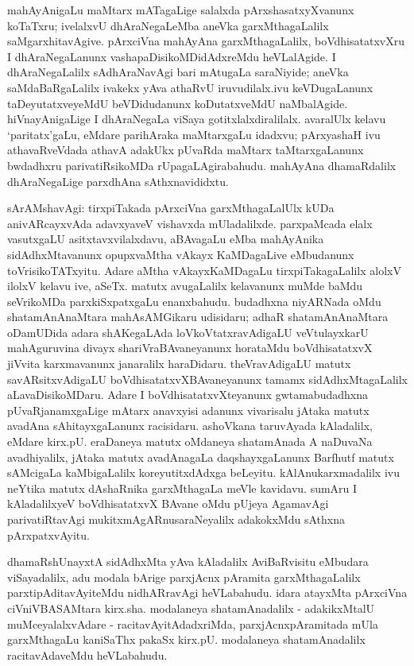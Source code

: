 mahAyAnigaLu maMtarx mATagaLige salalxda pArxshasatxyXvanunx koTaTxru; ivelalxvU dhAraNegaLeMba aneVka garxMthagaLalilx saMgarxhitavAgive. pArxciVna mahAyAna garxMthagaLalilx, boVdhisatatxvXru I dhAraNegaLanunx vashapaDisikoMDidAdxreMdu heVLalAgide. I dhAraNegaLalilx sAdhAraNavAgi bari mAtugaLa saraNiyide; aneVka saMdaBaRgaLalilx ivakekx yAva athaRvU iruvudilalx.ivu keVDugaLanunx taDeyutatxveyeMdU beVDidudanunx koDutatxveMdU naMbalAgide. hiVnayAnigaLige I dhAraNegaLa viSaya gotitxlalx\-diralilalx. avaralUlx kelavu `paritatx'gaLu, eMdare parihAraka maMtarxgaLu idadxvu; pArxyashaH ivu athavaRveVdada athavA adakUkx pUvaRda maMtarx taMtarxgaLanunx bwdadhxru parivatiRsikoMDa rUpagaLAgirabahudu. mahAyAna dhamaRdalilx dhAraNegaLige parxdhAna sAthxnavididxtu.

sArAMshavAgi: tirxpiTakada pArxciVna garxMthagaLalUlx kUDa anivARcayxvAda adavxyaveV vishavxda mUladalilxde. parxpaMcada elalx vasutxgaLU asitxtavxvilalxdavu, aBAva\-gaLu eMba mahAyAnika sidAdhxMtavanunx opupxvaMtha vAkayx KaMDagaLive eMbudanunx toVrisi\-koTATxyitu. Adare aMtha vAkayxKaMDagaLu tirxpiTakagaLalilx alolxV ilolxV kelavu ive, aSeTx. matutx avugaLalilx kelavanunx muMde baMdu seVrikoMDa parxkiSxpatxgaLu enanx\-bahudu. budadhxna niyARNada oMdu shatamAnAnaMtara mahAsAMGikaru udi\-sidaru; adhaR shatamAnAnaMtara oDamUDida adara shAKegaLAda loVkoVtatxravAdigaLU veVtulayxkarU mahAguruvina divayx shariVraBAvaneyanunx horataMdu boVdhisatatxvX jiVvita karxmavanunx janaralilx haraDidaru. theVravAdigaLU matutx savARsitxvAdigaLU boVdhisatatxvXBAvaneyanunx tamamx sidAdhxMtagaLalilx aLavaDisikoMDaru. Adare I boVdhi\-satatxvXteyanunx gwtamabudadhxna pUvaRjanamxgaLige mAtarx anavxyisi adanunx vivarisalu jAtaka matutx avadAna sAhitayxgaLanunx racisidaru. ashoVkana taruvAyada kAladalilx, eMdare kirx.pU. eraDaneya matutx oMdaneya shatamAnada A naDuvaNa avadhiyalilx, jAtaka matutx avadAnagaLa daqshayxgaLanunx Barfhutf matutx sAMcigaLa kaMbigaLalilx kore\-yutitxdAdxga beLeyitu. kAlAnukarxmadalilx ivu neYtika matutx dAshaRnika garxMthagaLa meVle kavidavu. sumAru I kAladalilxyeV boVdhisatatxvX BAvane oMdu pUjeya Agama\-vAgi parivatiRtavAgi mukitxmAgARnusaraNeyalilx adakokxMdu sAthxna pArxpatxvAyitu.

dhamaRshUnayxtA sidAdhxMta yAva kAladalilx AviBaRvisitu eMbudara viSayadalilx, adu modala bArige parxjAcnx pAramita garxMthagaLalilx parxtipAditavAyiteMdu nidhARra\-vAgi heVLabahudu. idara atayxMta pArxciVna ciVniVBASAMtara kirx.sha. modalaneya shatamAnadalilx - adakikxMtalU muMceyalalxvAdare - racitavAyitAdadxriMda, parxjAcnxpAramitada mUla garxMthagaLu kaniSaThx pakaSx kirx.pU. modalaneya shatamAnadalilx racitavAdaveMdu heVLabahudu.

